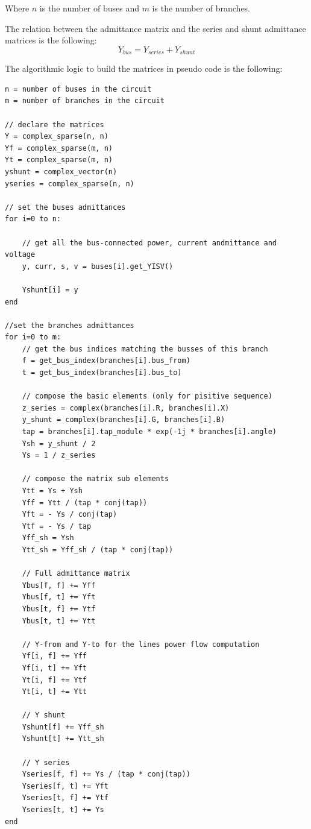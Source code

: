 \documentclass[a4paper,twoside,fleqn]{tufte-book}
\begin{document}
Where $n$ is the number of buses and $m$ is the number of branches.

The relation between the admittance matrix and the series and shunt admittance matrices is the following:
\begin{equation}
Y_{bus} = Y_{series} + Y_{shunt}
\end{equation}

The algorithmic logic to build the matrices in pseudo code is the following:

\begin{verbatim}
n = number of buses in the circuit
m = number of branches in the circuit

// declare the matrices
Y = complex_sparse(n, n)
Yf = complex_sparse(m, n)
Yt = complex_sparse(m, n)
yshunt = complex_vector(n)
yseries = complex_sparse(n, n)

// set the buses admittances
for i=0 to n:

    // get all the bus-connected power, current andmittance and voltage
    y, curr, s, v = buses[i].get_YISV()

    Yshunt[i] = y
end

//set the branches admittances
for i=0 to m:
    // get the bus indices matching the busses of this branch
    f = get_bus_index(branches[i].bus_from)
    t = get_bus_index(branches[i].bus_to)
    
    // compose the basic elements (only for pisitive sequence)
    z_series = complex(branches[i].R, branches[i].X)
    y_shunt = complex(branches[i].G, branches[i].B)
    tap = branches[i].tap_module * exp(-1j * branches[i].angle)
    Ysh = y_shunt / 2
    Ys = 1 / z_series

    // compose the matrix sub elements
    Ytt = Ys + Ysh
    Yff = Ytt / (tap * conj(tap))
    Yft = - Ys / conj(tap)
    Ytf = - Ys / tap    
    Yff_sh = Ysh
    Ytt_sh = Yff_sh / (tap * conj(tap))
    
    // Full admittance matrix
    Ybus[f, f] += Yff
    Ybus[f, t] += Yft
    Ybus[t, f] += Ytf
    Ybus[t, t] += Ytt
    
    // Y-from and Y-to for the lines power flow computation
    Yf[i, f] += Yff
    Yf[i, t] += Yft
    Yt[i, f] += Ytf
    Yt[i, t] += Ytt
    
    // Y shunt
    Yshunt[f] += Yff_sh
    Yshunt[t] += Ytt_sh
    
    // Y series
    Yseries[f, f] += Ys / (tap * conj(tap))
    Yseries[f, t] += Yft
    Yseries[t, f] += Ytf
    Yseries[t, t] += Ys
end

\end{verbatim}
\end{document}
